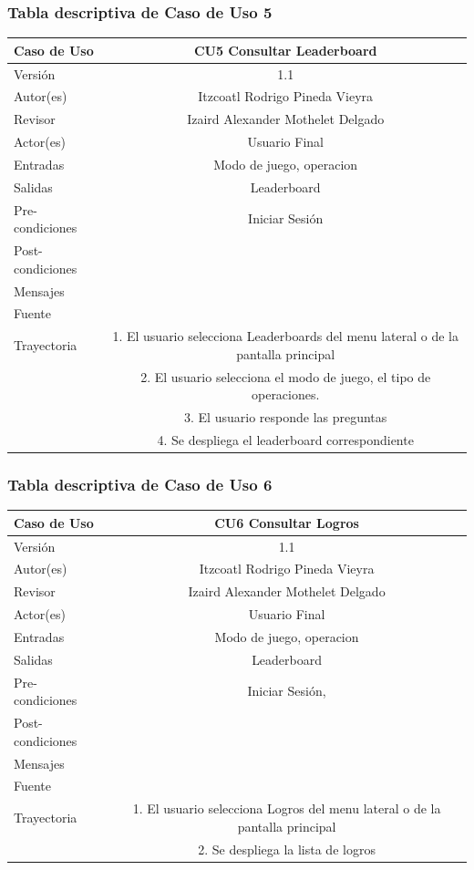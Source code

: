 \documentclass{article}
\begin{document}
\subsubsection{Tabla descriptiva de Caso de Uso 5}
\begin{tabular}{|M{5cm}|c|}
\hline
Caso de Uso & CU5 Consultar Leaderboard\\ \hline
Versión & 1.1\\ \hline
Autor(es) & Itzcoatl Rodrigo Pineda Vieyra\\ \hline
Revisor & Izaird Alexander Mothelet Delgado \\ \hline
Actor(es) & Usuario Final \\ \hline
Entradas &  Modo de juego, operacion \\ \hline
Salidas & Leaderboard \\ \hline
Pre-condiciones & Iniciar Sesión\\ \hline
Post-condiciones & \\ \hline
Mensajes & \\
Fuente &  \\ \hline	
	Trayectoria
		& 1.	El usuario selecciona Leaderboards del menu lateral o de la pantalla principal \\
		& 2. El usuario selecciona el modo de juego, el tipo de operaciones.\\
		& 3.    El usuario responde  las preguntas \\
		& 4.	Se despliega el leaderboard correspondiente\\ \hline
\end{tabular}
\subsubsection{Tabla descriptiva de Caso de Uso 6}
\begin{tabular}{|M{5cm}|c|}
\hline
Caso de Uso & CU6 Consultar Logros\\ \hline
Versión & 1.1\\ \hline
Autor(es) & Itzcoatl Rodrigo Pineda Vieyra\\ \hline
Revisor & Izaird Alexander Mothelet Delgado \\ \hline
Actor(es) & Usuario Final \\ \hline
Entradas &  Modo de juego, operacion \\ \hline
Salidas & Leaderboard \\ \hline
Pre-condiciones & Iniciar Sesión,  \\ \hline
Post-condiciones & \\ \hline
Mensajes & \\
Fuente &  \\ \hline	
	Trayectoria
		& 1. El usuario selecciona Logros del menu lateral o de la pantalla principal \\
		& 2. Se despliega la lista de logros \\ \hline
\end{tabular}
\end{document}
